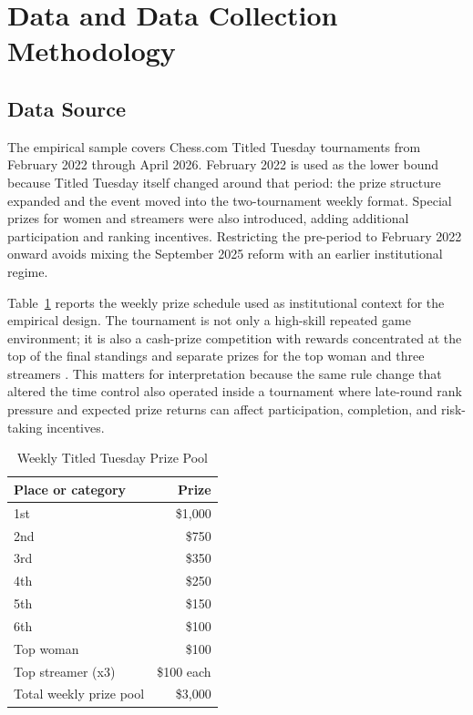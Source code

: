 \section{Data and Data Collection Methodology}

\subsection{Data Source}

The empirical sample covers Chess.com Titled Tuesday tournaments from February 2022 through April 2026. February 2022 is used as the lower bound because Titled Tuesday itself changed around that period: the prize structure expanded and the event moved into the two-tournament weekly format. Special prizes for women and streamers were also introduced, adding additional participation and ranking incentives. Restricting the pre-period to February 2022 onward avoids mixing the September 2025 reform with an earlier institutional regime.

Table~\ref{tab:titled-tuesday-prizes} reports the weekly prize schedule used as institutional context for the empirical design. The tournament is not only a high-skill repeated game environment; it is also a cash-prize competition with rewards concentrated at the top of the final standings and separate prizes for the top woman and three streamers \citep{chesscom_titled_tuesday}. This matters for interpretation because the same rule change that altered the time control also operated inside a tournament where late-round rank pressure and expected prize returns can affect participation, completion, and risk-taking incentives.

\begin{table}[H]
\centering
\caption{Weekly Titled Tuesday Prize Pool}
\label{tab:titled-tuesday-prizes}
\begin{tabular}{lr}
\toprule
Place or category & Prize \\
\midrule
1st & \$1,000 \\
2nd & \$750 \\
3rd & \$350 \\
4th & \$250 \\
5th & \$150 \\
6th & \$100 \\
Top woman & \$100 \\
Top streamer (x3) & \$100 each \\
\midrule
Total weekly prize pool & \$3,000 \\
\bottomrule
\end{tabular}
\end{table}


